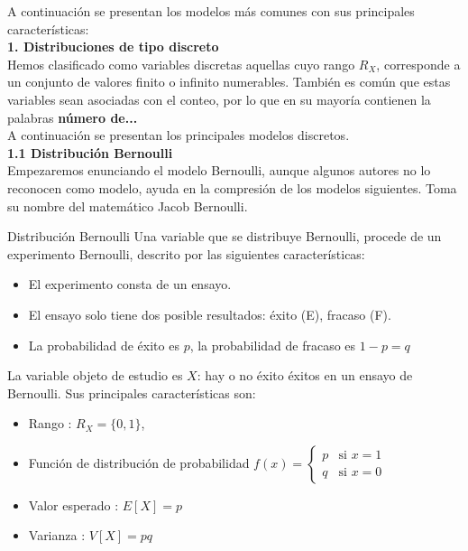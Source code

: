 \documentclass[base=hide,12pt]{elegantbook}
\begin{document}
A continuación se presentan los modelos más comunes con sus principales características:\\

\textcolor{col4}{\LARGE  \bf 1. Distribuciones de tipo discreto }\\

Hemos clasificado como variables discretas aquellas cuyo rango $R_{X}$, corresponde a un conjunto de valores finito o infinito numerables. También es común que estas variables sean asociadas con el conteo, por lo que en su mayoría contienen la palabras {\bf número de...} \\

A continuación se presentan los principales modelos discretos.\\ 

\vspace{.5cm}
\textcolor{col4}{\LARGE  \bf 1.1 Distribución Bernoulli}\\

Empezaremos  enunciando el modelo Bernoulli, aunque algunos autores no lo reconocen como modelo, ayuda en la compresión de los modelos siguientes. Toma  su nombre del matemático Jacob Bernoulli.\\

\begin{Box2}{Distribución Bernoulli}
	\vspace{.3cm}	
	Una variable que se distribuye Bernoulli, procede de un experimento Bernoulli, descrito por las siguientes características:
	\begin{itemize}
		\item El experimento consta de un ensayo.
		\item El ensayo solo tiene dos posible resultados: éxito (E), fracaso (F).
		\item La probabilidad de éxito es $p$, la probabilidad de fracaso es $1-p=q$ 
	\end{itemize}
	La variable objeto de estudio es $X$: hay o no éxito éxitos en un ensayo de Bernoulli. Sus principales características son:
	\begin{itemize}
		\item Rango : $R_{X}=\{0,1 \}$,
		\item Función de distribución de probabilidad $
		f(x)=\left\lbrace
		\begin{array}{lll}
			p & \mbox{si } x=1   \\
			q & \mbox{si } x=0
		\end{array}
		\right.
		$
		\item Valor esperado : $E[X]= p$
		\item Varianza : $V[X]= pq$
	\end{itemize}
\end{Box2}
\end{document}
